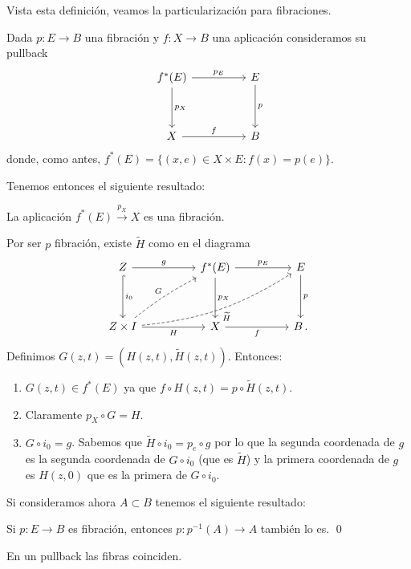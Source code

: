 Vista esta definición, veamos la particularización para fibraciones. \par Dada $p : E \longrightarrow B$ una fibración y $f : X \longrightarrow B$ una aplicación consideramos su pullback
\[
\begin{tikzcd}
f^*(E) \arrow{rr}{p_E} \arrow{dd}{p_X} & & E \arrow{dd}{p} \\
\\
X \arrow{rr}{f} & & B
\end{tikzcd}
\]
donde, como antes, $f^*(E) = \{ (x,e) \in X \times E : f(x) = p(e) \}$. \par
Tenemos entonces el siguiente resultado:
\begin{teor}
La aplicación $f^*(E) \stackrel{p_X}{\longrightarrow} X$ es una fibración.
\end{teor}
\begin{demo}
Por ser $p$ fibración, existe $\widetilde{H}$ como en el diagrama
\[
\begin{tikzcd}
Z \arrow{rr}{g} \arrow[hook]{dd}{i_0} && f^*(E) \arrow{rr}{p_E} \arrow{dd}{p_X} && E \arrow{dd}{p} \\
\\
Z\times I \arrow[swap]{rr}{H} \arrow[dashed, bend left=5]{uurr}{G} \arrow[dashed, bend right=13, swap]{rrrruu}{\widetilde{H}} && X \arrow[swap]{rr}{f} && B \, .
\end{tikzcd}
\]
Definimos $G(z,t) = \left(H(z,t), \widetilde{H}(z,t)\right)$. Entonces:
\begin{enumerate}
\item $G(z,t) \in f^*(E)$ ya que $f \circ H(z,t) = p \circ \widetilde{H}(z,t)$.
\item Claramente $p_X \circ G = H$.
\item $G \circ i_0 = g$. Sabemos que $\widetilde{H} \circ i_0 = p_e \circ g$ por lo que la segunda coordenada de $g$ es la segunda coordenada de $G \circ i_0$ (que es $\widetilde{H}$) y la primera coordenada de $g$ es $H(z,0)$ que es la primera de $G \circ i_0$. 
\end{enumerate}
\end{demo}
Si consideramos ahora $A \subset B$ tenemos el siguiente resultado:
\begin{coro}
Si $p : E \longrightarrow B$ es fibración, entonces $p : p^{-1}(A) \longrightarrow A$ también lo es. \qed
\end{coro}
\begin{prop}
En un pullback las fibras coinciden.
\end{prop}
